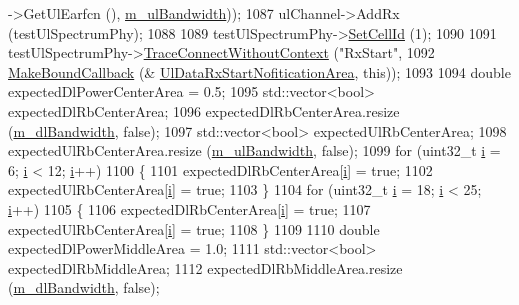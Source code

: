 \begin{DoxyCode}
      ->GetUlEarfcn (), \hyperlink{classLteFrAreaTestCase_afa54487d9f12658bbead39e1272f4d8c}{m\_ulBandwidth}));
1087   ulChannel->AddRx (testUlSpectrumPhy);
1088 
1089   testUlSpectrumPhy->\hyperlink{classns3_1_1LteSimpleSpectrumPhy_aed3e4883b1f03358a744746b08fbd5d8}{SetCellId} (1);
1090 
1091   testUlSpectrumPhy->\hyperlink{classns3_1_1ObjectBase_a1be45f6fd561e75dcac9dfa81b2b81e4}{TraceConnectWithoutContext} (\textcolor{stringliteral}{"RxStart"},
1092                                                  \hyperlink{group__makeboundcallback_ga1725d6362e6065faa0709f7c93f8d770}{MakeBoundCallback} (&
      \hyperlink{lte-test-frequency-reuse_8cc_a1011b9d239710e3f627e9aada5d64778}{UlDataRxStartNofiticationArea}, \textcolor{keyword}{this}));
1093 
1094   \textcolor{keywordtype}{double} expectedDlPowerCenterArea = 0.5;
1095   std::vector<bool> expectedDlRbCenterArea;
1096   expectedDlRbCenterArea.resize (\hyperlink{classLteFrAreaTestCase_a645fc2cea287afbd373f6d702152cf47}{m\_dlBandwidth}, \textcolor{keyword}{false});
1097   std::vector<bool> expectedUlRbCenterArea;
1098   expectedUlRbCenterArea.resize (\hyperlink{classLteFrAreaTestCase_afa54487d9f12658bbead39e1272f4d8c}{m\_ulBandwidth}, \textcolor{keyword}{false});
1099   \textcolor{keywordflow}{for} (uint32\_t \hyperlink{bernuolliDistribution_8m_a6f6ccfcf58b31cb6412107d9d5281426}{i} = 6; \hyperlink{bernuolliDistribution_8m_a6f6ccfcf58b31cb6412107d9d5281426}{i} < 12; \hyperlink{bernuolliDistribution_8m_a6f6ccfcf58b31cb6412107d9d5281426}{i}++)
1100     \{
1101       expectedDlRbCenterArea[\hyperlink{bernuolliDistribution_8m_a6f6ccfcf58b31cb6412107d9d5281426}{i}] = \textcolor{keyword}{true};
1102       expectedUlRbCenterArea[\hyperlink{bernuolliDistribution_8m_a6f6ccfcf58b31cb6412107d9d5281426}{i}] = \textcolor{keyword}{true};
1103     \}
1104   \textcolor{keywordflow}{for} (uint32\_t \hyperlink{bernuolliDistribution_8m_a6f6ccfcf58b31cb6412107d9d5281426}{i} = 18; \hyperlink{bernuolliDistribution_8m_a6f6ccfcf58b31cb6412107d9d5281426}{i} < 25; \hyperlink{bernuolliDistribution_8m_a6f6ccfcf58b31cb6412107d9d5281426}{i}++)
1105     \{
1106       expectedDlRbCenterArea[\hyperlink{bernuolliDistribution_8m_a6f6ccfcf58b31cb6412107d9d5281426}{i}] = \textcolor{keyword}{true};
1107       expectedUlRbCenterArea[\hyperlink{bernuolliDistribution_8m_a6f6ccfcf58b31cb6412107d9d5281426}{i}] = \textcolor{keyword}{true};
1108     \}
1109 
1110   \textcolor{keywordtype}{double} expectedDlPowerMiddleArea = 1.0;
1111   std::vector<bool> expectedDlRbMiddleArea;
1112   expectedDlRbMiddleArea.resize (\hyperlink{classLteFrAreaTestCase_a645fc2cea287afbd373f6d702152cf47}{m\_dlBandwidth}, \textcolor{keyword}{false});

\end{DoxyCode}
